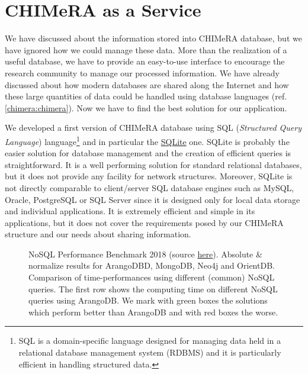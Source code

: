 \documentclass{standalone}
\begin{document}
\section[CHIMeRA as a Service]{CHIMeRA as a Service}\label{chimera:caas}

We have discussed about the information stored into \textsf{CHIMeRA} database, but we have ignored how we could manage these data.
More than the realization of a useful database, we have to provide an easy-to-use interface to encourage the research community to manage our processed information.
We have already discussed about how modern databases are shared along the Internet and how these large quantities of data could be handled using database languages (ref. \ref{chimera:chimera}).
Now we have to find the best solution for our application.

We developed a first version of \textsf{CHIMeRA} database using \textsf{SQL} (\emph{Structured Query Language}) language\footnote{
  \textsf{SQL} is a domain-specific language designed for managing data held in a relational database management system (RDBMS) and it is particularly efficient in handling structured data.

} and in particular the \href{https://www.sqlite.org/index.html}{\textsf{SQLite}} one.
\textsf{SQLite} is probably the easier solution for database management and the creation of efficient queries is straightforward.
It is a well performing solution for standard relational databases, but it does not provide any facility for network structures.
Moreover, \textsf{SQLite} is not directly comparable to client/server \textsf{SQL} database engines such as \textsf{MySQL}, \textsf{Oracle}, \textsf{PostgreSQL} or \textsf{SQL Server} since it is designed only for local data storage and individual applications.
It is extremely efficient and simple in its applications, but it does not cover the requirements posed by our \textsf{CHIMeRA} structure and our needs about sharing information.

\begin{figure}[htbp]
\centering
\def\svgwidth{0.8\textwidth}

\caption{\textsf{NoSQL} Performance Benchmark 2018 (source \href{https://www.arangodb.com/2018/02/nosql-performance-benchmark-2018-mongodb-postgresql-orientdb-neo4j-arangodb/}{here}).
Absolute \& normalize results for \textsf{ArangoDBD}, \textsf{MongoDB}, \textsf{Neo4j} and \textsf{OrientDB}.
Comparison of time-performances using different (common) \textsf{NoSQL} queries.
The first row shows the computing time on different \textsf{NoSQL} queries using \textsf{ArangoDB}.
We mark with green boxes the solutions which perform better than \textsf{ArangoDB} and with red boxes the worse.
}
\label{fig:arango}
\end{figure}
\end{document}

